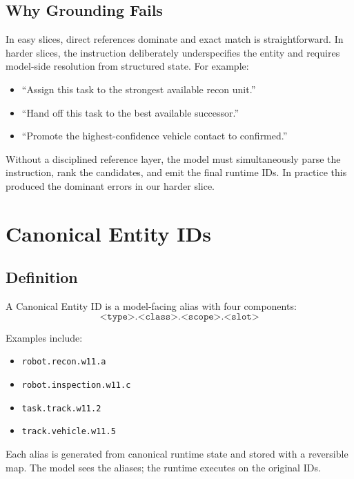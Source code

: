 \documentclass[manuscript,screen,review]{jair}
\begin{document}
\subsection{Why Grounding Fails}
In easy slices, direct references dominate and exact match is straightforward. In harder slices, the instruction deliberately underspecifies the entity and requires model-side resolution from structured state. For example:
\begin{itemize}[leftmargin=*]
  \item \enquote{Assign this task to the strongest available recon unit.}
  \item \enquote{Hand off this task to the best available successor.}
  \item \enquote{Promote the highest-confidence vehicle contact to confirmed.}
\end{itemize}

Without a disciplined reference layer, the model must simultaneously parse the instruction, rank the candidates, and emit the final runtime IDs. In practice this produced the dominant errors in our harder slice.

\section{Canonical Entity IDs}
\subsection{Definition}
A Canonical Entity ID is a model-facing alias with four components:
\[
\texttt{<type>.<class>.<scope>.<slot>}
\]

Examples include:
\begin{itemize}[leftmargin=*]
  \item \texttt{robot.recon.w11.a}
  \item \texttt{robot.inspection.w11.c}
  \item \texttt{task.track.w11.2}
  \item \texttt{track.vehicle.w11.5}
\end{itemize}

Each alias is generated from canonical runtime state and stored with a reversible map. The model sees the aliases; the runtime executes on the original IDs.
\end{document}
